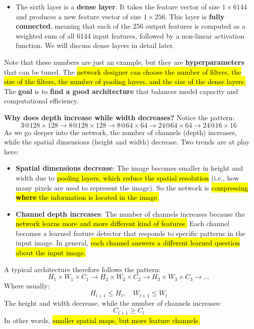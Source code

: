 \begin{itemize}
    
    \item The sixth layer is a \textbf{dense layer}. It takes the feature vector of size $1\times6144$ and produces a new feature vector of size $1\times256$. This layer is \textbf{fully connected}, meaning that each of the 256 output features is computed as a weighted sum of all 6144 input features, followed by a non-linear activation function. We will discuss dense layers in detail later.
\end{itemize}
Note that these numbers are just an example, but they are \textbf{hyperparameters} that can be tuned. The \hl{network designer can choose the number of filters, the size of the filters, the number of pooling layers, and the size of the dense layers.} The \textbf{goal} is to \textbf{find a good architecture} that balances model capacity and computational efficiency.

\highspace
\textcolor{Green3}{ \textbf{Why does depth increase while width decreases?}} Notice the pattern:
\begin{equation*}
    3@128\times128 \to 8@128\times128 \to 8@64\times64 \to 24@64\times64 \to 24@16\times16
\end{equation*}
As we go deeper into the network, the number of channels (depth) increases, while the spatial dimensions (height and width) decrease. Two trends are at play here:
\begin{itemize}\label{sec:depth-increases-while-width-decreases}
    \item[\textcolor{Green3}{\faIcon{arrow-down}}] \textbf{Spatial dimensions decrease}: The image becomes smaller in height and width due to \hl{pooling layers, which reduce the spatial resolution} (i.e., how many pixels are used to represent the image). So the network is \hl{compressing \textbf{where} the information is located in the image.}
    

    \item[\textcolor{Green3}{\faIcon{arrow-up}}] \textbf{Channel depth increases}: The number of channels increases because the \hl{network learns more and more different kind of features.} Each channel becomes a learned feature detector that responds to specific patterns in the input image. In general, \hl{each channel answers a different learned question about the input image.}
\end{itemize}
A typical architecture therefore follows the pattern:
\begin{equation*}
    H_1 \times W_1 \times C_1 \to H_2 \times W_2 \times C_2 \to H_3 \times W_3 \times C_3 \to \ldots
\end{equation*}
Where usually:
\begin{equation*}
    H_{l+1} \leq H_l, \quad W_{l+1} \leq W_l
\end{equation*}
The height and width decrease, while the number of channels increases:
\begin{equation*}
    C_{l+1} \geq C_l
\end{equation*}
In other words, \hl{smaller spatial maps, but more feature channels.}

